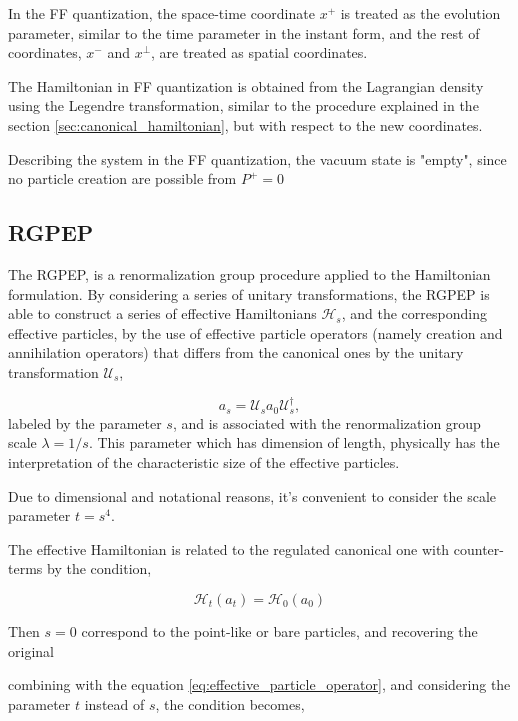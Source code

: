 \documentclass[11pt,a4paper,twoside,pdf]{article}
\numberwithin{equation}{section}
\begin{document}
In the FF quantization, the space-time coordinate $x^+$ is treated as the evolution 
parameter, similar to the time parameter in the instant form, and the rest of 
coordinates, $x^-$ and $x^\perp$, are treated as spatial coordinates.

The Hamiltonian in FF quantization is obtained from the Lagrangian density using 
the Legendre transformation, similar to the procedure explained in the section
\ref{sec:canonical_hamiltonian}, but with respect to the new coordinates.

Describing the system in the FF quantization, the vacuum state is "empty", since 
no particle creation are possible from $P^+ = 0$

\subsection{RGPEP}
The RGPEP, is a renormalization group procedure applied to the Hamiltonian 
formulation. By considering a series of unitary transformations, the RGPEP is able to construct a 
series of effective Hamiltonians $\mathcal{H}_s$, and the corresponding effective 
particles, by the use of effective particle operators (namely creation and 
annihilation operators) that differs from the canonical ones by the unitary 
transformation $\mathcal{U}_s$,

\begin{equation}
    a_s = \mathcal{U}_sa_0\mathcal{U}_s^\dagger,
    \label{eq:effective_particle_operator}
\end{equation}
labeled by the parameter $s$, and is associated with the renormalization group scale
$\lambda = 1/s$. This parameter which has dimension of length, physically has the 
interpretation of the characteristic size of the effective particles.

Due to dimensional and notational reasons, it's convenient to consider the scale 
parameter $t = s^4$.

The effective Hamiltonian is related to the regulated canonical one with counter-terms 
by the condition,

\begin{equation}
    \mathcal{H}_t(a_t) = \mathcal{H}_0(a_0)
\end{equation}

Then $s=0$ correspond to the point-like or bare particles, and recovering the original

combining with the equation \eqref{eq:effective_particle_operator}, and considering 
the parameter $t$ instead of $s$, the condition becomes,
\end{document}
